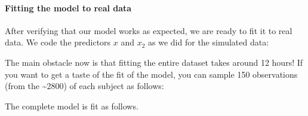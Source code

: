 \documentclass[12pt,]{krantz}
\newenvironment{Shaded}{\begin{snugshade}}{\end{snugshade}}
\newcommand{\KeywordTok}[1]{\textcolor[rgb]{0.13,0.29,0.53}{\textbf{#1}}}
\newcommand{\DataTypeTok}[1]{\textcolor[rgb]{0.13,0.29,0.53}{#1}}
\newcommand{\DecValTok}[1]{\textcolor[rgb]{0.00,0.00,0.81}{#1}}
\newcommand{\FloatTok}[1]{\textcolor[rgb]{0.00,0.00,0.81}{#1}}
\newcommand{\StringTok}[1]{\textcolor[rgb]{0.31,0.60,0.02}{#1}}
\newcommand{\OperatorTok}[1]{\textcolor[rgb]{0.81,0.36,0.00}{\textbf{#1}}}
\newcommand{\NormalTok}[1]{#1}
\let\oldparagraph\paragraph
\renewcommand{\paragraph}[1]{\oldparagraph{#1}\mbox{}}
\theoremstyle{definition}
\theoremstyle{definition}
\theoremstyle{definition}
\theoremstyle{remark}
\begin{document}
\paragraph{Fitting the model to real
data}\label{fitting-the-model-to-real-data}

After verifying that our model works as expected, we are ready to fit it
to real data. We code the predictors \(x\) and \(x_2\) as we did for the
simulated data:

\begin{Shaded}
\end{Shaded}

The main obstacle now is that fitting the entire dataset takes around 12
hours! If you want to get a taste of the fit of the model, you can
sample 150 observations (from the \textasciitilde{}2800) of each subject
as follows:

\begin{Shaded}
\end{Shaded}

The complete model is fit as follows.

\begin{Shaded}
\end{Shaded}
\end{document}
